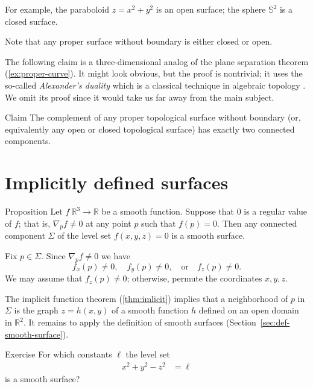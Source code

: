 For example, the paraboloid $z=x^2+y^2$
is an open surface; the 
sphere $\mathbb{S}^2$ is a closed surface.

Note that any proper surface without boundary is either closed or open.

The following claim is a three-dimensional analog of the plane separation theorem (\ref{ex:proper-curve}).
It might look obvious, but the proof is nontrivial; it uses the so-called {}\emph{Alexander's duality} which is a classical technique in algebraic topology \cite[see][]{hatcher}.
We omit its proof since it would take us far away from the main subject.

\begin{thm}{Claim}\label{clm:proper-divides}
The complement of any proper topological surface without boundary (or, equivalently any open or closed topological surface) has exactly two connected components. 
\end{thm}

\section{Implicitly defined surfaces}

\begin{thm}{Proposition}\label{prop:implicit-surface}
Let $f\:\mathbb{R}^3\to \mathbb{R}$ be a smooth function.
Suppose that $0$ is a regular value of $f$;
that is, $\nabla_p f\ne 0$ at any point $p$ such that $f(p)=0$.
Then any connected component $\Sigma$ of the level set  $f(x,y,z)=0$ is a smooth surface.
\end{thm}

Fix $p\in\Sigma$.
Since $\nabla_p f\ne 0$ we have 
\[f_x(p)\ne 0,\quad f_y(p)\ne 0,\quad \text{or}\quad f_z(p)\ne 0.\]
We may assume that $f_z(p)\ne 0$;
otherwise, permute the coordinates $x,y,z$.

The implicit function theorem (\ref{thm:imlicit}) implies that a neighborhood of $p$ in $\Sigma$ is the graph $z=h(x,y)$ of a smooth function $h$ defined on an open domain in $\mathbb{R}^2$.
It remains to apply the definition of smooth surfaces (Section~\ref{sec:def-smooth-surface}).
\qeds

\begin{thm}{Exercise}\label{ex:hyperboloinds}
For which constants $\ell$ 
the level set
\begin{align*}
x^2+y^2-z^2&=\ell
\end{align*}
is a smooth surface?
\end{thm}

